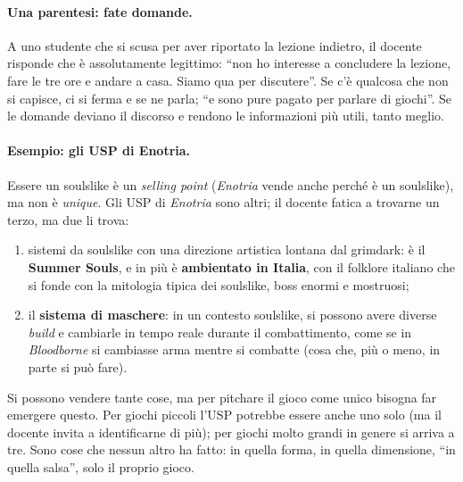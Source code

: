 \paragraph{Una parentesi: fate domande.} A uno studente che si scusa per aver
riportato la lezione indietro, il docente risponde che è assolutamente
legittimo: ``non ho interesse a concludere la lezione, fare le tre ore e
andare a casa. Siamo qua per discutere''. Se c'è qualcosa che non si capisce,
ci si ferma e se ne parla; ``e sono pure pagato per parlare di giochi''. Se le
domande deviano il discorso e rendono le informazioni più utili, tanto meglio.

\paragraph{Esempio: gli USP di Enotria.} Essere un soulslike è un
\emph{selling point} (\emph{Enotria} vende anche perché è un soulslike), ma
non è \emph{unique}. Gli USP di \emph{Enotria} sono altri; il docente fatica a
trovarne un terzo, ma due li trova:
\begin{enumerate}
  \item sistemi da soulslike con una direzione artistica lontana dal
        grimdark: è il \textbf{Summer Souls}, e in più è \textbf{ambientato in
        Italia}, con il folklore italiano che si fonde con la mitologia
        tipica dei soulslike, boss enormi e mostruosi;
  \item il \textbf{sistema di maschere}: in un contesto soulslike, si possono
        avere diverse \emph{build} e cambiarle in tempo reale durante il
        combattimento, come se in \emph{Bloodborne} si cambiasse arma mentre
        si combatte (cosa che, più o meno, in parte si può fare).
\end{enumerate}
Si possono vendere tante cose, ma per pitchare il gioco come unico bisogna
far emergere questo. Per giochi piccoli l'USP potrebbe essere anche uno solo
(ma il docente invita a identificarne di più); per giochi molto grandi in
genere si arriva a tre. Sono cose che nessun altro ha fatto: in quella forma,
in quella dimensione, ``in quella salsa'', solo il proprio gioco.

